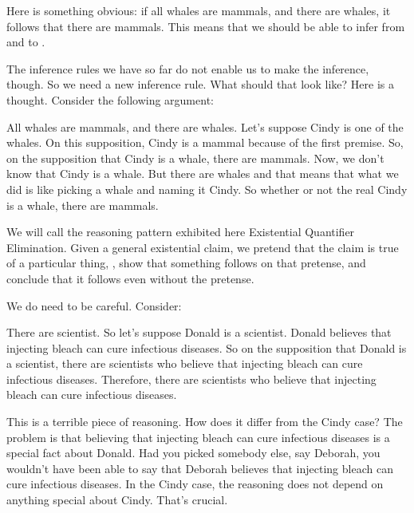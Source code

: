 Here is something obvious: if all whales are mammals, and there are whales, it 
follows that there are mammals. This means that we should be able to infer from 
 and  to . 


The inference rules we have so far do not enable us to make the inference, 
though. So we need a new inference rule. What should that look like? Here is a 
thought.  Consider the following argument:

\begin{Example}

All whales are mammals, and there are whales.  Let's suppose Cindy is one of the 
whales. On this supposition, Cindy is a mammal because of the first premise.  So, 
on the supposition that Cindy is a whale, there are mammals.  Now, we don't know 
that Cindy is a whale. But there are whales and that means that what we did is 
like picking a whale and naming it Cindy. So whether or not the real Cindy is a 
whale, there are mammals. 

\end{Example}

We will call the reasoning pattern exhibited here Existential Quantifier 
Elimination. Given a general existential claim, we pretend that the claim is 
true of a particular thing, \p{\kappa}, show that something follows on that 
pretense, and conclude that it follows even without the pretense.

We do need to be careful. Consider:

\begin{Example}

 There are scientist. So let's suppose Donald is a scientist. Donald believes 
 that injecting bleach can cure infectious diseases. So on the supposition that 
 Donald is a scientist, there are scientists who believe that injecting bleach 
 can cure infectious diseases.   Therefore, there are scientists who believe 
 that injecting bleach can cure infectious diseases.

\end{Example}

This is a terrible piece of reasoning. How does it differ from the Cindy case?  
The problem is that believing that injecting bleach can cure infectious diseases 
is a special fact about Donald. Had you picked somebody else, say Deborah, you 
wouldn't have been able to say that Deborah believes that injecting bleach can 
cure infectious diseases. In the Cindy case, the reasoning does not depend on 
anything special about Cindy. That's crucial.

